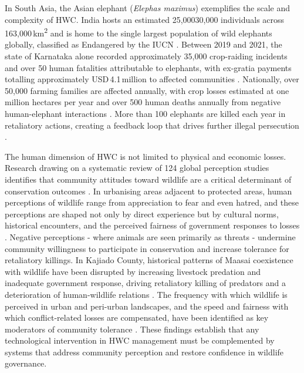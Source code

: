 \documentclass[12pt,a4paper]{article}
\begin{document}
    In South Asia, the Asian elephant (\textit{Elephas maximus}) exemplifies the scale and
    complexity of HWC. India hosts an estimated 25,00030,000 individuals across
    163,000\,km\textsuperscript{2} and is home to the single largest population of wild
    elephants globally, classified as Endangered by the IUCN \cite{muliya2026}. Between 2019
    and 2021, the state of Karnataka alone recorded approximately 35,000 crop-raiding incidents
    and over 50 human fatalities attributable to elephants, with ex-gratia payments totalling
    approximately USD\,4.1\,million to affected communities \cite{muliya2026}. Nationally, over
    50,000 farming families are affected annually, with crop losses estimated at one million
    hectares per year and over 500 human deaths annually from negative human-elephant
    interactions \cite{muliya2026}. More than 100 elephants are killed each year in retaliatory
    actions, creating a feedback loop that drives further illegal persecution \cite{muliya2026}.

    The human dimension of HWC is not limited to physical and economic losses. Research
    drawing on a systematic review of 124 global perception studies identifies that community
    attitudes toward wildlife are a critical determinant of conservation outcomes \cite{basak2023}.
    In urbanising areas adjacent to protected areas, human perceptions of wildlife range from
    appreciation to fear and even hatred, and these perceptions are shaped not only by direct
    experience but by cultural norms, historical encounters, and the perceived fairness of
    government responses to losses \cite{basak2023}. Negative perceptions - where animals are
    seen primarily as threats - undermine community willingness to participate in conservation
    and increase tolerance for retaliatory killings. In Kajiado County, historical patterns of
    Maasai coexistence with wildlife have been disrupted by increasing livestock predation and
    inadequate government response, driving retaliatory killing of predators and a deterioration
    of human-wildlife relations \cite{mbiki2025}. The frequency with which wildlife is perceived
    in urban and peri-urban landscapes, and the speed and fairness with which conflict-related
    losses are compensated, have been identified as key moderators of community tolerance
    \cite{basak2023,mbiki2025}. These findings establish that any technological intervention in
    HWC management must be complemented by systems that address community perception
    and restore confidence in wildlife governance.
\end{document}
